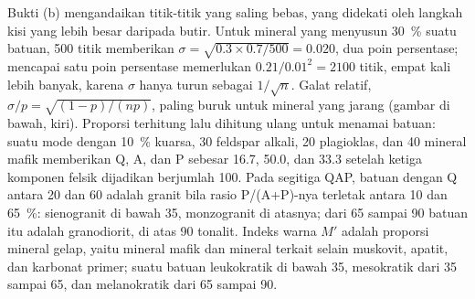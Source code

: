 Bukti (b) mengandaikan titik-titik yang saling bebas, yang didekati oleh langkah kisi yang lebih besar daripada
butir. Untuk mineral yang menyusun \qty{30}{\percent} suatu batuan, 500 titik memberikan $\sigma =
\sqrt{0.3 \times 0.7/500} = 0.020$, dua poin persentase; mencapai satu poin persentase memerlukan
$0.21/0.01^2 = 2100$ titik, empat kali lebih banyak, karena $\sigma$ hanya turun sebagai $1/\sqrt n$.
Galat relatif, $\sigma/p = \sqrt{(1-p)/(np)}$, paling buruk untuk mineral yang jarang (gambar di bawah,
kiri). Proporsi terhitung lalu dihitung ulang untuk menamai batuan: suatu mode dengan
\qty{10}{\percent} kuarsa, 30 feldspar alkali, 20 plagioklas, dan 40 mineral mafik memberikan Q, A, dan
P sebesar 16.7, 50.0, dan 33.3 setelah ketiga komponen felsik dijadikan berjumlah 100. Pada segitiga
QAP, batuan dengan Q antara 20 dan 60 adalah granit bila rasio P/(A+P)-nya terletak antara 10 dan
\qty{65}{\percent}: sienogranit di bawah 35, monzogranit di atasnya; dari 65 sampai 90 batuan itu adalah
granodiorit, di atas 90 tonalit. Indeks warna $M'$ adalah proporsi mineral gelap, yaitu
mineral mafik dan mineral terkait selain muskovit, apatit, dan karbonat primer; suatu batuan
leukokratik di bawah 35, mesokratik dari 35 sampai 65, dan melanokratik dari 65 sampai 90.

